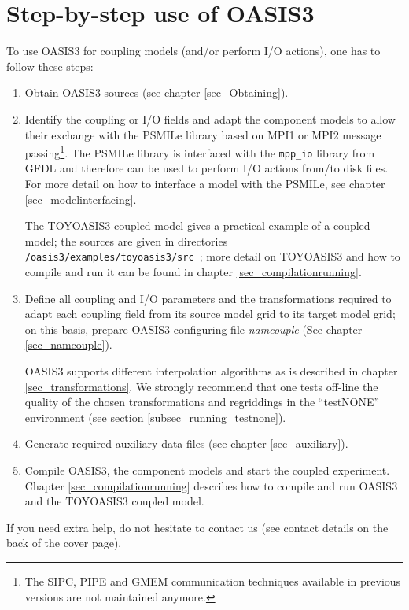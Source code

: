 

\section{Step-by-step use of OASIS3}

To use OASIS3 for coupling models (and/or perform I/O
actions), one has to follow these steps:
\begin{enumerate}
\item Obtain OASIS3 sources (see chapter \ref{sec_Obtaining}).
\item Identify the coupling or I/O fields and adapt the component
  models to allow their exchange with the PSMILe library based on MPI1
  or MPI2 message passing\footnote{The SIPC, PIPE and GMEM
    communication techniques available in previous versions are not maintained anymore.}.
  The PSMILe library is interfaced with the {\tt mpp\_io} library from
  GFDL \cite{mpp_io} and therefore can be used to perform I/O actions
  from/to disk files.  For more detail on how to interface a model
  with the PSMILe, see chapter \ref{sec_modelinterfacing}.

The TOYOASIS3 coupled model gives a practical example of a coupled
model; the sources are given in directories {\tt
  /oasis3/examples/toyoasis3/src }; more detail on TOYOASIS3 and
how to compile and run it can be found in chapter
\ref{sec_compilationrunning}.

\item Define all coupling and I/O parameters and the transformations
  required to adapt each coupling field from its source model grid to
  its target model grid; on this basis, prepare OASIS3 configuring file {\it
  namcouple} (See chapter \ref{sec_namcouple}). 
  
  OASIS3 supports different interpolation algorithms as is described in
  chapter \ref{sec_transformations}. We strongly recommend that one tests off-line the quality
  of the chosen transformations and regriddings in the ``testNONE'' environment (see section \ref{subsec_running_testnone}).

\item Generate required auxiliary data files (see chapter
  \ref{sec_auxiliary}).
\item Compile OASIS3, the component models and start the coupled
  experiment. Chapter \ref{sec_compilationrunning} describes how to
  compile and run OASIS3 and the TOYOASIS3 coupled model.

\end{enumerate}

If you need extra help, do not hesitate to contact us (see contact
details on the back of the cover page).

